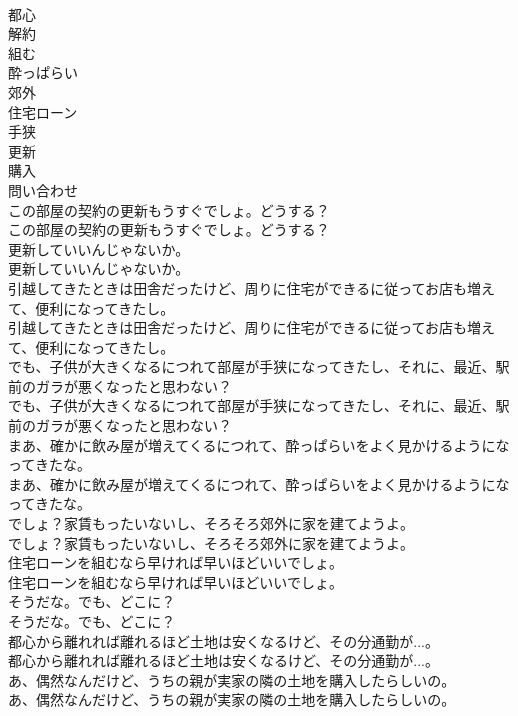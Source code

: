 \documentclass[8pt]{extreport}
\begin{document}
\begin{CJK}{UTF8}{min}
\\	都心
\\	解約
\\	組む
\\	酔っぱらい
\\	郊外
\\	住宅ローン
\\	手狭
\\	更新
\\	購入
\\	問い合わせ
\\	この部屋の契約の更新もうすぐでしょ。どうする？	
\\	この部屋の契約の更新もうすぐでしょ。どうする？ 
\\	更新していいんじゃないか。	
\\	更新していいんじゃないか。 
\\	引越してきたときは田舎だったけど、周りに住宅ができるに従ってお店も増えて、便利になってきたし。	
\\	引越してきたときは田舎だったけど、周りに住宅ができるに従ってお店も増えて、便利になってきたし。 
\\	でも、子供が大きくなるにつれて部屋が手狭になってきたし、それに、最近、駅前のガラが悪くなったと思わない？	
\\	でも、子供が大きくなるにつれて部屋が手狭になってきたし、それに、最近、駅前のガラが悪くなったと思わない？ 
\\	まあ、確かに飲み屋が増えてくるにつれて、酔っぱらいをよく見かけるようになってきたな。	
\\	まあ、確かに飲み屋が増えてくるにつれて、酔っぱらいをよく見かけるようになってきたな。 
\\	でしょ？家賃もったいないし、そろそろ郊外に家を建てようよ。	
\\	でしょ？家賃もったいないし、そろそろ郊外に家を建てようよ。 
\\	住宅ローンを組むなら早ければ早いほどいいでしょ。	
\\	住宅ローンを組むなら早ければ早いほどいいでしょ。 
\\	そうだな。でも、どこに？	
\\	そうだな。でも、どこに？ 
\\	都心から離れれば離れるほど土地は安くなるけど、その分通勤が...。	
\\	都心から離れれば離れるほど土地は安くなるけど、その分通勤が...。 
\\	あ、偶然なんだけど、うちの親が実家の隣の土地を購入したらしいの。	
\\	あ、偶然なんだけど、うちの親が実家の隣の土地を購入したらしいの。 

\end{CJK}
\end{document}
